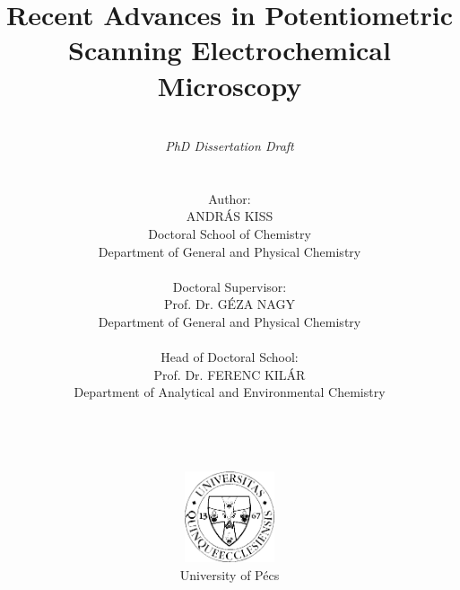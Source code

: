 \pagestyle{empty}

\title{\textbf{Recent Advances in Potentiometric Scanning Electrochemical Microscopy}}

\author{\\ \emph{PhD Dissertation Draft} \\ \\ \\ Author: \\ ANDRÁS KISS \\ Doctoral School of Chemistry \\ Department of General and Physical Chemistry \\ \\ Doctoral Supervisor: \\ Prof. Dr. GÉZA NAGY
\\ Department of General and Physical Chemistry \\
\\ Head of Doctoral School: \\
Prof. Dr. FERENC KILÁR\\
Department of Analytical and Environmental Chemistry \\
\\ \\ \\ \\
\includegraphics[width=0.2\textwidth]{img/pte_logo.eps} \\
University of Pécs}
\maketitle

\thispagestyle{empty}
\large
\setcounter{tocdepth}{4}
\tableofcontents
\newpage
\thispagestyle{empty}
\thispagestyle{empty}
